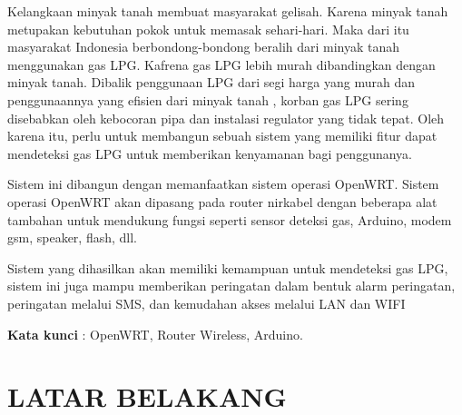 \documentclass{jtetiproposalskripsi}
\begin{document}
\cover

\approvalpage


\begin{abstractind}
Kelangkaan minyak tanah membuat masyarakat gelisah. Karena minyak tanah metupakan kebutuhan pokok untuk memasak sehari-hari. Maka dari itu masyarakat Indonesia berbondong-bondong beralih dari minyak tanah menggunakan gas LPG. Kafrena gas LPG lebih murah dibandingkan dengan minyak tanah. Dibalik penggunaan LPG dari segi harga yang murah dan penggunaannya yang efisien dari minyak tanah , korban gas LPG sering disebabkan oleh kebocoran pipa dan instalasi regulator yang tidak tepat. Oleh karena itu, perlu untuk membangun sebuah sistem yang memiliki fitur dapat mendeteksi gas LPG untuk memberikan kenyamanan bagi penggunanya.

Sistem ini dibangun dengan memanfaatkan sistem operasi OpenWRT. Sistem operasi OpenWRT akan dipasang pada router nirkabel dengan beberapa alat tambahan untuk mendukung fungsi seperti sensor deteksi gas, Arduino, modem gsm, speaker, flash, dll.

Sistem yang dihasilkan akan memiliki kemampuan untuk mendeteksi gas LPG, sistem ini juga mampu memberikan peringatan dalam bentuk alarm peringatan, peringatan melalui SMS, dan kemudahan akses melalui LAN dan WIFI


\bigskip
\textbf{Kata kunci} : OpenWRT, Router Wireless, Arduino.
\end{abstractind}

\tableofcontents
{}
\clearpage{}\setcounter{page}{1}

\chapter{LATAR BELAKANG}
\end{document}
